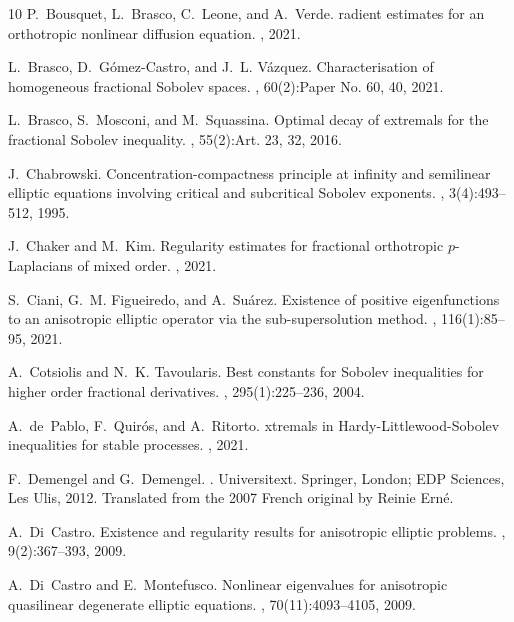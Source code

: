 \documentclass[11pt]{amsart}
\theoremstyle{plain}
\theoremstyle{definition}
\numberwithin{equation}{section}
\begin{document}
\begin{thebibliography}{10}
P.~Bousquet, L.~Brasco, C.~Leone, and A.~Verde.
radient estimates for an orthotropic nonlinear diffusion equation.
, 2021.

L.~Brasco, D.~G\'{o}mez-Castro, and J.~L. V\'{a}zquez.
\newblock Characterisation of homogeneous fractional {S}obolev spaces.
, 60(2):Paper No. 60,
  40, 2021.

L.~Brasco, S.~Mosconi, and M.~Squassina.
\newblock Optimal decay of extremals for the fractional {S}obolev inequality.
, 55(2):Art. 23, 32,
  2016.

J.~Chabrowski.
\newblock Concentration-compactness principle at infinity and semilinear
  elliptic equations involving critical and subcritical {S}obolev exponents.
, 3(4):493--512, 1995.

J.~Chaker and M.~Kim.
\newblock Regularity estimates for fractional orthotropic $p$-Laplacians of mixed order.
, 2021.

S.~Ciani, G.~M. Figueiredo, and A.~Su\'{a}rez.
\newblock Existence of positive eigenfunctions to an anisotropic elliptic
  operator via the sub-supersolution method.
, 116(1):85--95, 2021.

A.~Cotsiolis and N.~K. Tavoularis.
\newblock Best constants for {S}obolev inequalities for higher order fractional
  derivatives.
, 295(1):225--236, 2004.

A.~de~Pablo, F.~Quirós, and A.~Ritorto.
xtremals in {H}ardy-{L}ittlewood-{S}obolev inequalities for stable
  processes.
, 2021.

F.~Demengel and G.~Demengel.
.
\newblock Universitext. Springer, London; EDP Sciences, Les Ulis, 2012.
\newblock Translated from the 2007 French original by Reinie Ern\'{e}.

A.~Di~Castro.
\newblock Existence and regularity results for anisotropic elliptic problems.
, 9(2):367--393, 2009.

A.~Di~Castro and E.~Montefusco.
\newblock Nonlinear eigenvalues for anisotropic quasilinear degenerate elliptic
  equations.
, 70(11):4093--4105, 2009.


\end{thebibliography}
\end{document}
